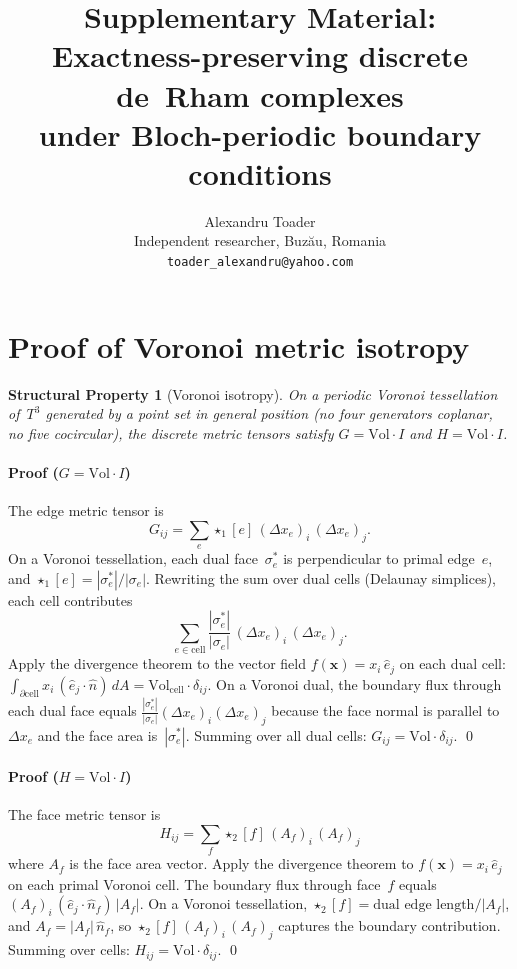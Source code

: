 \documentclass[12pt]{article}
\title{Supplementary Material:\\
Exactness-preserving discrete de~Rham complexes\\
under Bloch-periodic boundary conditions}
\author{Alexandru Toader\\
Independent researcher, Buz\u{a}u, Romania\\
\texttt{toader\_alexandru@yahoo.com}}
\date{}
\newtheorem{property}[theorem]{Structural Property}
\theoremstyle{remark}
\newcommand{\Vol}{\mathrm{Vol}}
\begin{document}
\maketitle

\section{Proof of Voronoi metric isotropy}
\label{sec:S1}

\begin{property}[Voronoi isotropy]
On a periodic Voronoi tessellation of~$T^3$ generated by a point set in
general position (no four generators coplanar, no five cocircular), the
discrete metric tensors satisfy $G = \Vol \cdot I$ and $H = \Vol \cdot I$.
\end{property}

\paragraph{Proof ($G = \Vol \cdot I$)}
The edge metric tensor is
\[
  G_{ij} = \sum_e \star_1[e]\,(\Delta x_e)_i\,(\Delta x_e)_j.
\]
On a Voronoi tessellation, each dual face~$\sigma^*_e$ is perpendicular to
primal edge~$e$, and $\star_1[e] = |\sigma^*_e|/|\sigma_e|$. Rewriting the
sum over dual cells (Delaunay simplices), each cell contributes
\[
  \sum_{e \in \text{cell}} \frac{|\sigma^*_e|}{|\sigma_e|}
  \,(\Delta x_e)_i\,(\Delta x_e)_j.
\]
Apply the divergence theorem to the vector field $f(\mathbf{x}) = x_i\,\hat{e}_j$
on each dual cell:
$\int_{\partial\text{cell}} x_i\,(\hat{e}_j \cdot \hat{n})\,dA =
\Vol_{\text{cell}} \cdot \delta_{ij}$.
On a Voronoi dual, the boundary flux through each dual face equals
$\frac{|\sigma^*_e|}{|\sigma_e|}(\Delta x_e)_i(\Delta x_e)_j$ because the
face normal is parallel to~$\Delta x_e$ and the face area is~$|\sigma^*_e|$.
Summing over all dual cells: $G_{ij} = \Vol \cdot \delta_{ij}$. \qed

\paragraph{Proof ($H = \Vol \cdot I$)}
The face metric tensor is
\[
  H_{ij} = \sum_f \star_2[f]\,(A_f)_i\,(A_f)_j
\]
where $A_f$ is the face area vector. Apply the divergence theorem to
$f(\mathbf{x}) = x_i\,\hat{e}_j$ on each primal Voronoi cell. The boundary
flux through face~$f$ equals $(A_f)_i\,(\hat{e}_j \cdot \hat{n}_f)\,|A_f|$.
On a Voronoi tessellation, $\star_2[f] = \text{dual edge length} / |A_f|$,
and $A_f = |A_f|\,\hat{n}_f$, so
$\star_2[f]\,(A_f)_i\,(A_f)_j$ captures the boundary contribution.
Summing over cells: $H_{ij} = \Vol \cdot \delta_{ij}$. \qed
\end{document}
